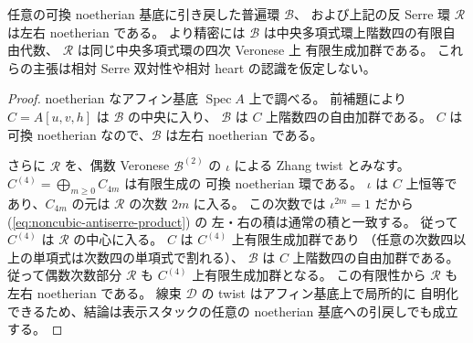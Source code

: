 \begin{proposition}
\label{prop:noncubic-relative-noetherian}
任意の可換 noetherian 基底に引き戻した普遍環 $\mathcal B$、
および上記の反 Serre 環 $\mathcal R$ は左右 noetherian である。
より精密には $\mathcal B$ は中央多項式環上階数四の有限自由代数、
$\mathcal R$ は同じ中央多項式環の四次 Veronese 上
有限生成加群である。
これらの主張は相対 Serre 双対性や相対 heart の認識を仮定しない。
\end{proposition}
\begin{proof}
noetherian なアフィン基底 $\operatorname{Spec}A$ 上で調べる。
前補題により
$C=A[u,v,h]$ は $\mathcal B$ の中央に入り、
$\mathcal B$ は $C$ 上階数四の自由加群である。
$C$ は可換 noetherian なので、$\mathcal B$ は左右 noetherian である。

さらに $\mathcal R$ を、偶数 Veronese
$\mathcal B^{(2)}$ の $\iota$ による Zhang twist とみなす。
$C^{(4)}=\bigoplus_{m\ge0}C_{4m}$ は有限生成の
可換 noetherian 環である。
$\iota$ は $C$ 上恒等であり、$C_{4m}$ の元は
$\mathcal R$ の次数 $2m$ に入る。
この次数では $\iota^{2m}=1$ だから
(\ref{eq:noncubic-antiserre-product}) の
左・右の積は通常の積と一致する。
従って $C^{(4)}$ は $\mathcal R$ の中心に入る。
$C$ は $C^{(4)}$ 上有限生成加群であり
（任意の次数四以上の単項式は次数四の単項式で割れる）、
$\mathcal B$ は $C$ 上階数四の自由加群である。
従って偶数次数部分 $\mathcal R$ も
$C^{(4)}$ 上有限生成加群となる。
この有限性から $\mathcal R$ も左右 noetherian である。
線束 $\mathcal D$ の twist はアフィン基底上で局所的に
自明化できるため、結論は表示スタックの任意の
noetherian 基底への引戻しでも成立する。
\end{proof}

